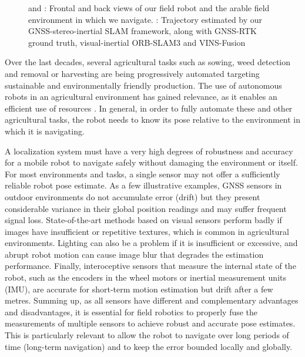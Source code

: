 \begin{figure}[!htbp]
    \caption{\protect{} and \protect{}: Frontal and back views of our field robot and the arable field environment in which we navigate. \protect{}: Trajectory estimated by our GNSS-stereo-inertial SLAM framework, along with GNSS-RTK ground truth,  visual-inertial ORB-SLAM3 \cite{campos2021orbslam3} and VINS-Fusion \cite{qin2019general}}
    \label{fig:teaser_image}
\end{figure}

Over the last decades, several agricultural tasks such as sowing, weed detection and removal or harvesting are being progressively automated targeting sustainable and environmentally friendly production. The use of autonomous robots in an agricultural environment has gained relevance, as it enables an efficient use of resources \cite{carelli2013agriculturalrobotics, wouter2014harvesting}. In general, in order to fully automate these and other agricultural tasks, the robot needs to know its pose relative to the environment in which it is navigating. 

A localization system must have a very high degrees of robustness and accuracy for a mobile robot to navigate safely without damaging the environment or itself. For most environments and tasks, a single sensor may not offer a sufficiently reliable robot pose estimate. As a few illustrative examples, GNSS sensors in outdoor environments do not accumulate error (drift) but they present considerable variance in their global position readings and may suffer frequent signal loss. State-of-the-art methods based on visual sensors perform badly if images have insufficient or repetitive textures, which is common in agricultural environments. Lighting can also be a problem if it is insufficient or excessive, and abrupt robot motion can cause image blur that degrades the estimation performance. Finally, interoceptive sensors that measure the internal state of the robot, such as the encoders in the wheel motors or inertial measurement units (IMU), are accurate for short-term motion estimation but drift after a few metres. Summing up, as all sensors have different and complementary advantages and disadvantages, it is essential for field robotics to properly fuse the measurements of multiple sensors to achieve robust and accurate pose estimates. This is particularly relevant to allow the robot to navigate over long periods of time (long-term navigation) and to keep the error bounded locally and globally.


